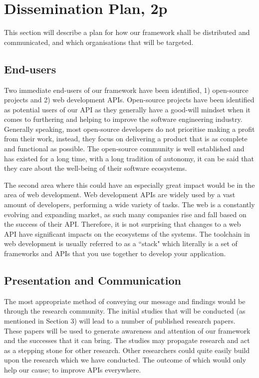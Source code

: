 \documentclass{article}
\begin{document}
\section{Dissemination Plan, 2p}
This section will describe a plan for how our framework shall be distributed and communicated, and which organisations that will be targeted. 

\subsection{End-users}

Two immediate end-users of our framework have been identified, 1) open-source projects and 2) web development APIs. Open-source projects have been identified as potential users of our API as they generally have a good-will mindset when it comes to furthering and helping to improve the software engineering industry. Generally speaking, most open-source developers do not prioritise making a profit from their work, instead, they focus on delivering a product that is as complete and functional as possible. The open-source community is well established and has existed for a long time, with a long tradition of autonomy, it can be said that they care about the well-being of their software ecosystems. 

The second area where this could have an especially great impact would be in the area of web development. Web development APIs are widely used by a vast amount of developers, performing a wide variety of tasks. The web is a constantly evolving and expanding market, as such many companies rise and fall based on the success of their API. Therefore, it is not surprising that changes to a web API have significant impacts on the ecosystems of the systems. The toolchain in web development is usually referred to as a ``stack" which literally is a set of frameworks and APIs that you use together to develop your application.

\subsection{Presentation and Communication}
The most appropriate method of conveying our message and findings would be through the research community. The initial studies that will be conducted (as mentioned in Section 3) will lead to a number of published research papers. These papers will be used to generate awareness and attention of our framework and the successes that it can bring. The studies may propagate research and act as a stepping stone for other research. Other researchers could quite easily build upon the research which we have conducted. The outcome of which would only help our cause; to improve APIs everywhere. 
\end{document}
